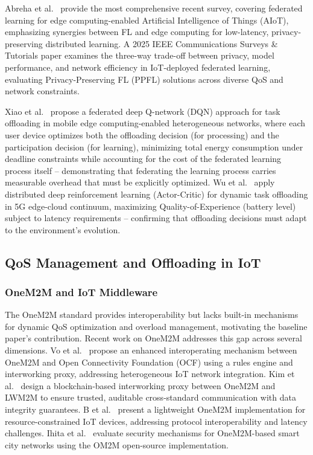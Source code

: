 Abreha et al.\ \cite{Abreha26KBS} provide the most comprehensive recent survey, covering federated learning for edge computing-enabled Artificial Intelligence of Things (AIoT), emphasizing synergies between FL and edge computing for low-latency, privacy-preserving distributed learning. A 2025 IEEE Communications Surveys \& Tutorials paper \cite{Xiao25ComST} examines the three-way trade-off between privacy, model performance, and network efficiency in IoT-deployed federated learning, evaluating Privacy-Preserving FL (PPFL) solutions across diverse QoS and network constraints.

Xiao et al.\ \cite{Xiao24IoTJ} propose a federated deep Q-network (DQN) approach for task offloading in mobile edge computing-enabled heterogeneous networks, where each user device optimizes both the offloading decision (for processing) and the participation decision (for learning), minimizing total energy consumption under deadline constraints while accounting for the cost of the federated learning process itself -- demonstrating that federating the learning process carries measurable overhead that must be explicitly optimized. Wu et al.\ \cite{Wu24JCC} apply distributed deep reinforcement learning (Actor-Critic) for dynamic task offloading in 5G edge-cloud continuum, maximizing Quality-of-Experience (battery level) subject to latency requirements -- confirming that offloading decisions must adapt to the environment's evolution.

\subsection{QoS Management and Offloading in IoT}
\label{subsec:qos-offload}

\subsubsection{OneM2M and IoT Middleware}

The OneM2M standard provides interoperability but lacks built-in mechanisms for dynamic QoS optimization and overload management, motivating the baseline paper's contribution. Recent work on OneM2M addresses this gap across several dimensions. Vo et al.\ \cite{Vo23ACCESS} propose an enhanced interoperating mechanism between OneM2M and Open Connectivity Foundation (OCF) using a rules engine and interworking proxy, addressing heterogeneous IoT network integration. Kim et al.\ \cite{Kim23JIPS} design a blockchain-based interworking proxy between OneM2M and LWM2M to ensure trusted, auditable cross-standard communication with data integrity guarantees. B et al.\ \cite{B24DSIT} present a lightweight OneM2M implementation for resource-constrained IoT devices, addressing protocol interoperability and latency challenges. Ihita et al.\ \cite{Ihita23COMSNETS} evaluate security mechanisms for OneM2M-based smart city networks using the OM2M open-source implementation.

